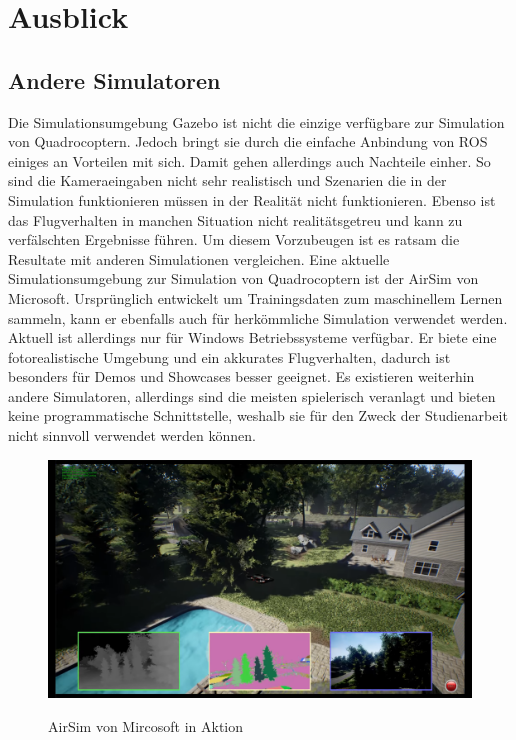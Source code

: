 \section{Ausblick}
\subsection{Andere Simulatoren}
Die Simulationsumgebung Gazebo ist nicht die einzige verfügbare zur Simulation von Quadrocoptern. Jedoch bringt sie durch die einfache Anbindung von ROS einiges an Vorteilen mit sich. Damit gehen allerdings auch Nachteile einher. So sind die Kameraeingaben nicht sehr realistisch und Szenarien die in der Simulation funktionieren müssen in der Realität nicht funktionieren. Ebenso ist das Flugverhalten in manchen Situation nicht realitätsgetreu und kann zu verfälschten Ergebnisse führen. Um diesem Vorzubeugen ist es ratsam die Resultate mit anderen Simulationen vergleichen. Eine aktuelle Simulationsumgebung zur Simulation von Quadrocoptern ist der AirSim von Microsoft.\cite{airsim} Ursprünglich entwickelt um Trainingsdaten zum maschinellem Lernen sammeln, kann er ebenfalls auch für herkömmliche Simulation verwendet werden. Aktuell ist allerdings nur für Windows Betriebssysteme verfügbar. \cite{airsimpaper} Er biete eine fotorealistische Umgebung und ein akkurates Flugverhalten, dadurch ist besonders für Demos und Showcases besser geeignet. \newline
Es existieren weiterhin andere Simulatoren, allerdings sind die meisten spielerisch veranlagt und bieten keine programmatische Schnittstelle, weshalb sie für den Zweck der Studienarbeit nicht sinnvoll verwendet werden können.
\begin{figure}[ht]
	\centering
	\includegraphics[scale=0.28]{Bilder/airsim.png}
	\label{fig:airsim}
	\caption{AirSim von Mircosoft in Aktion\cite{airsim}}
\end{figure}



